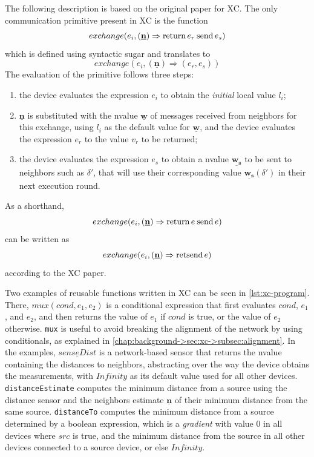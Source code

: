 The following description is based on the original paper for \ac{XC}\cite{xc}.
%
The only communication primitive present in \ac{XC} is the function $$exchange(e_i, (\underline{\mathbf{n}}) \Rightarrow \mathbf{\operatorname{return\,}} e_r \mathbf{\operatorname{\:send\,}} e_s)$$ which is defined using syntactic sugar and translates to $$exchange(e_i, (\underline{\mathbf{n}}) \Rightarrow (e_r, e_s))$$
%
The evaluation of the primitive follows three steps:
\begin{enumerate}
    \item the device evaluates the expression $e_i$ to obtain the \textit{initial} local value $l_i$;
    \item $\underline{\mathbf{n}}$ is substituted with the nvalue $\underline{\mathbf{w}}$ of messages received from neighbors for this exchange, using $l_i$ as the default value for $\underline{\mathbf{w}}$, and the device evaluates the expression $e_r$ to the value $v_r$ to be returned;
    \item the device evaluates the expression $e_s$ to obtain a nvalue $\underline{\mathbf{w_s}}$ to be sent to neighbors such as $\delta'$, that will use their corresponding value $\underline{\mathbf{w_s}}(\delta')$ in their next execution round.
\end{enumerate}

As a shorthand, $$exchange(e_i, (\underline{\mathbf{n}}) \Rightarrow \mathbf{\operatorname{return\,}} e \mathbf{\operatorname{\:send\,}} e)$$ can be written as $$exchange(e_i, (\underline{\mathbf{n}}) \Rightarrow \mathbf{\operatorname{retsend\,}} e)$$ according to the \ac{XC} paper\cite{xc}.

Two examples of reusable functions written in \ac{XC} can be seen in \cref{lst:xc-program}.
%
There, $mux(cond, e_1, e_2)$ is a conditional expression that first evaluates $cond$, $e_1$, and $e_2$, and then returns the value of $e_1$ if $cond$ is true, or the value of $e_2$ otherwise.
%
\texttt{mux} is useful to avoid breaking the alignment of the network by using conditionals, as explained in \cref{chap:background->sec:xc->subsec:alignment}.
%
In the examples, $\underline{senseDist}$ is a network-based sensor that returns the nvalue containing the distances to neighbors, abstracting over the way the device obtains the measurements, with $Infinity$ as its default value used for all other devices.
%
\texttt{distanceEstimate} computes the minimum distance from a source using the distance sensor and the neighbors estimate $\underline{\mathbf{n}}$ of their minimum distance from the same source.
%
\texttt{distanceTo} computes the minimum distance from a source determined by a boolean expression, which is a \textit{gradient} with value $0$ in all devices where $src$ is true, and the minimum distance from the source in all other devices connected to a source device, or else $Infinity$.

